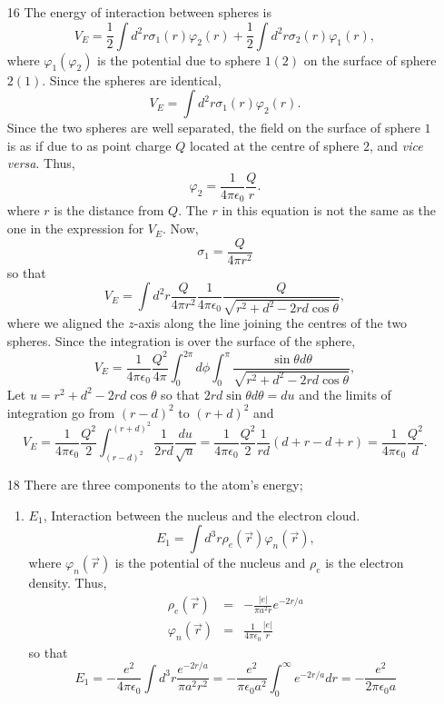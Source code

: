 \documentclass{article}
\newcommand{\ke}{\frac{1}{4\pi\epsilon_0}}
\begin{document}
\begin{enumerate}
\item[16] The energy of interaction between spheres is
\[
V_E = \frac{1}{2}\int d^2r \sigma_1(r)\varphi_2(r) + \frac{1}{2}\int d^2r \sigma_2(r)\varphi_1(r),
\]
where $\varphi_1(\varphi_2)$ is the potential due to sphere $1(2)$ on the surface
of sphere $2(1)$. Since the spheres are identical,
\[
V_E = \int d^2r \sigma_1(r)\varphi_2(r).
\]
Since the two spheres are well separated, the field on the surface of sphere $1$
is as if due to as point charge $Q$ located at the centre of sphere $2$, and 
\emph{vice versa}. Thus,
\[
\varphi_2 = \ke\frac{Q}{r}.
\]
where $r$ is the distance from $Q$. The $r$ in this equation is not the same as the
one in the expression for $V_E$. Now,
\[
\sigma_1 = \frac{Q}{4\pi r^2}
\]
so that
\[
V_E = \int d^2 r \frac{Q}{4\pi r^2} \ke \frac{Q}{\sqrt{r^2 + d^2 - 2rd\cos\theta}},
\]
where we aligned the $z$-axis along the line joining the centres of the two spheres.
Since the integration is over the surface of the sphere,
\[
V_E = \ke\frac{Q^2}{4\pi}\int_0^{2\pi}d\phi \int_0^\pi \frac{\sin\theta d\theta}{\sqrt{r^2 + d^2 - 2rd\cos\theta}},
\]
Let $u = r^2 + d^2 - 2rd\cos\theta$ so that $2rd\sin\theta d\theta = du$ and the 
limits of integration go from $(r - d)^2$ to $(r + d)^2$ and
\[
V_E = \ke \frac{Q^2}{2}\int_{(r - d)^2}^{(r + d)^2}\frac{1}{2rd}\frac{du}{\sqrt{u}} 
= \ke\frac{Q^2}{2}\frac{1}{rd}(d + r - d + r) = \ke\frac{Q^2}{d}.
\]

\item[18] There are three components to the atom's energy;
\begin{enumerate}
\item $E_1$, Interaction between the nucleus and the electron cloud. 
\[
E_1 = \int d^3r \rho_e(\vec{r})\varphi_n(\vec{r}),
\]
where $\varphi_n(\vec{r})$ is the potential of the nucleus and $\rho_e$ is the 
electron density. Thus,
\begin{eqnarray*}
\rho_e(\vec{r}) &=& -\frac{|e|}{\pi a^2r}e^{-2r/a} \\
\varphi_n(\vec{r}) &=& \ke\frac{|e|}{r}
\end{eqnarray*}
so that
\[
E_1 = -\frac{e^2}{4\pi\epsilon_0}\int d^3r \frac{e^{-2r/a}}{\pi a^2 r^2} = 
-\frac{e^2}{\pi\epsilon_0 a^2}\int_0^\infty e^{-2r/a}dr = -\frac{e^2}{2\pi\epsilon_0 a}
\]


\end{enumerate}
\end{enumerate}
\end{document}
